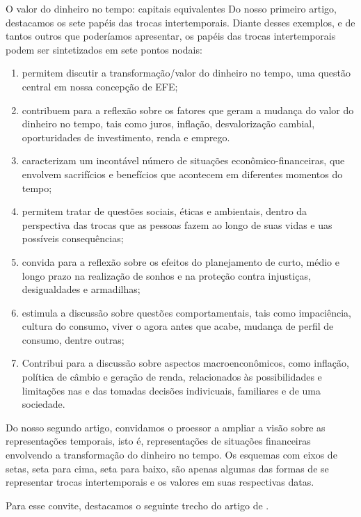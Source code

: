 \begin{paginatexto}{O valor do dinheiro no tempo: capitais equivalentes}
Do nosso primeiro artigo, destacamos os sete papéis das trocas intertemporais. Diante desses exemplos, e de tantos outros que poderíamos apresentar, os papéis das trocas intertemporais podem ser sintetizados em sete pontos nodais:
\begin{enumerate}
  \item permitem discutir a transformação/valor do dinheiro no tempo, uma questão central em nossa concepção de EFE;
  \item contribuem para a reflexão sobre os fatores que geram a mudança do valor do dinheiro no tempo, tais como juros, inflação, desvalorização cambial, oporturidades de investimento, renda e emprego.
  \item caracterizam um incontável número de situações econômico-financeiras, que envolvem sacrifícios e benefícios que acontecem em diferentes momentos do tempo;
  \item permitem tratar de questões sociais, éticas e ambientais, dentro da perspectiva das trocas que as pessoas fazem ao longo de suas vidas e uas possíveis consequências;
  \item convida para a reflexão sobre os efeitos do planejamento de curto, médio e longo prazo na realização de sonhos e na proteção contra injustiças, desigualdades e armadilhas;
  \item estimula a discussão sobre questões comportamentais, tais como impaciência, cultura do consumo, viver o agora antes que acabe, mudança de perfil de consumo, dentre outras;
  \item Contribui para a discussão sobre aspectos macroenconômicos, como inflação, política de câmbio e geração de renda, relacionados às possibilidades e limitações nas e das tomadas decisões indivicuais, familiares e de uma sociedade.
\end{enumerate}
  Do nosso segundo artigo, convidamos o proessor a ampliar a visão sobre as representações temporais, isto é, representações de situações financeiras envolvendo a transformação do dinheiro no tempo. Os esquemas com eixos de setas, seta para cima, seta para baixo, são apenas algumas das formas de se representar trocas intertemporais e os valores em suas respectivas datas.

  Para esse convite, destacamos o seguinte trecho do artigo de \cite[p. 125]{muniz2016b}.


\end{paginatexto}
